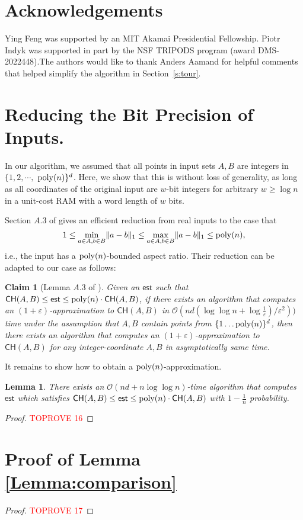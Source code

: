 \documentclass[11pt]{article}
\newcommand{\eps}{\varepsilon}
\theoremstyle{plain}
\newtheorem{lem}[theorem]{Lemma}
\newtheorem{clm}[theorem]{Claim}
\newcommand{\OO}{\mathcal{O}}
\begin{document}
\nocite{langley00}


\section*{Acknowledgements}
Ying Feng was supported by an MIT Akamai Presidential Fellowship. Piotr Indyk was supported in part by the NSF TRIPODS program (award DMS-2022448).The authors would like to thank Anders Aamand for helpful comments that helped simplify the algorithm in Section~\ref{s:tour}.

\def\shortbib{0}






\appendix

\section{Reducing the Bit Precision of Inputs.}

In our algorithm, we assumed that all points in input sets $A, B$ are integers in $\{1,2 , \cdots, $ ${\rm poly}(n)\}^d$. Here, we show that this is without loss of generality, as long as all coordinates of the original input are $w$-bit integers for arbitrary $w \geq \log n$ in a unit-cost RAM with a word length
of $w$ bits.

Section $A.3$ of \cite{BIJ24} gives an efficient reduction from real inputs to the case that \[1 \leq \min_{a \in A, b \in B} \lVert a - b\rVert_1  \leq \max_{a \in A, b \in B} \lVert a - b\rVert_1 \leq {\rm poly}(n),\] i.e., the input has a ${\rm poly}(n)$-bounded aspect ratio. Their reduction can be adapted to our case as follows: 


\begin{clm}[Lemma $A.3$ of \cite{BIJ24}]
    Given an $\mathsf{est}$ such that $\mathsf{CH}(A, B) \leq  \mathsf{est} \leq {\rm poly}(n) \cdot \mathsf{CH}(A, B)$, if there exists an algorithm that computes an $(1+\eps)$-approximation to $\mathsf{CH}(A, B)$ in $\OO(nd(\log\log n+\log\frac{1}{\eps})/\eps^2))$ time under the assumption that $A, B$ contain points from 
    $\{1 \ldots \mbox{{\rm poly}}(n) \}^d$, then there exists an algorithm that computes an $(1+\eps)$-approximation to $\mathsf{CH}(A, B)$ for any 
 integer-coordinate $A, B$ in asymptotically same time.
\end{clm}

It remains to show how to obtain a ${\rm poly}(n)$-approximation.

\begin{lem}
    There exists an $\OO(nd + n\log\log n)$-time algorithm that computes $\mathsf{est}$ which satisfies $\mathsf{CH}(A, B) \leq  \mathsf{est} \leq {\rm poly}(n)\cdot \mathsf{CH}(A, B)$ with $1-\frac{1}{n}$ probability.
\end{lem}

\begin{proof}\textcolor{red}{TOPROVE 16}\end{proof}

 \section{Proof of Lemma \ref{Lemma:comparison}}

\begin{proof}\textcolor{red}{TOPROVE 17}\end{proof} 
\end{document}
